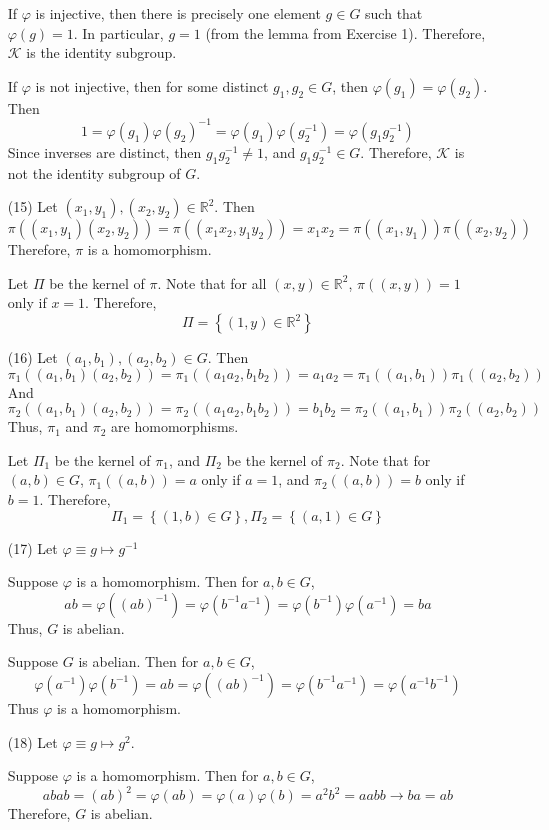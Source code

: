 \documentclass[12pt]{article}
\begin{document}
\begin{itemize}
If $\varphi$ is injective, then there is precisely one element $g \in G$ such that $\varphi(g) = 1$. In particular, $g = 1$ (from the lemma from Exercise 1). Therefore, $\mathcal{K}$ is the identity subgroup.

If $\varphi$ is not injective, then for some distinct $g_1, g_2 \in G$, then $\varphi(g_1) = \varphi(g_2)$. Then
$$1 = \varphi(g_1)\varphi(g_2)^{-1} = \varphi(g_1)\varphi(g_2^{-1}) = \varphi(g_1g_2^{-1})$$
Since inverses are distinct, then $g_1g_2^{-1} \neq 1$, and $g_1g_2^{-1} \in G$. Therefore, $\mathcal{K}$ is not the identity subgroup of $G$.
\item[(15)]
Let $(x_1, y_1), (x_2, y_2) \in \mathbb{R}^2$. Then
$$\pi((x_1, y_1)(x_2, y_2)) = \pi((x_1x_2, y_1y_2)) = x_1x_2 = \pi((x_1, y_1))\pi((x_2, y_2))$$
Therefore, $\pi$ is a homomorphism.

Let $\Pi$ be the kernel of $\pi$. Note that for all $(x, y) \in \mathbb{R}^2$, $\pi((x, y)) = 1$ only if $x = 1$. Therefore,
$$\Pi = \left\lbrace (1, y) \in \mathbb{R}^2 \right\rbrace$$
\item[(16)]
Let $(a_1, b_1), (a_2, b_2) \in G$. Then
$$\pi_1((a_1, b_1)(a_2, b_2)) = \pi_1((a_1a_2, b_1b_2)) = a_1a_2 = \pi_1((a_1, b_1))\pi_1((a_2, b_2))$$
And
$$\pi_2((a_1, b_1)(a_2, b_2)) = \pi_2((a_1a_2, b_1b_2)) = b_1b_2 = \pi_2((a_1, b_1))\pi_2((a_2, b_2))$$
Thus, $\pi_1$ and $\pi_2$ are homomorphisms.

Let $\Pi_1$ be the kernel of $\pi_1$, and $\Pi_2$ be the kernel of $\pi_2$. Note that for $(a, b) \in G$, $\pi_1((a, b)) = a$ only if $a = 1$, and $\pi_2((a, b)) = b$ only if $b = 1$. Therefore,
$$\Pi_1 = \left\lbrace (1, b) \in G \right\rbrace, \Pi_2 = \left\lbrace (a, 1) \in G \right\rbrace$$
\item[(17)]
Let $\varphi \equiv g \mapsto g^{-1}$

Suppose $\varphi$ is a homomorphism. Then for $a, b \in G$,
$$ab = \varphi((ab)^{-1}) = \varphi(b^{-1}a^{-1}) = \varphi(b^{-1})\varphi(a^{-1}) = ba$$
Thus, $G$ is abelian.

Suppose $G$ is abelian. Then for $a, b \in G$,
$$\varphi(a^{-1})\varphi(b^{-1}) = ab = \varphi((ab)^{-1}) = \varphi(b^{-1}a^{-1}) = \varphi(a^{-1}b^{-1})$$
Thus $\varphi$ is a homomorphism.
\item[(18)]
Let $\varphi \equiv g \mapsto g^2$.

Suppose $\varphi$ is a homomorphism. Then for $a, b \in G$,
$$abab = (ab)^2 = \varphi(ab) = \varphi(a)\varphi(b) = a^2b^2 = aabb \rightarrow ba = ab$$
Therefore, $G$ is abelian.


\end{itemize}
\end{document}
